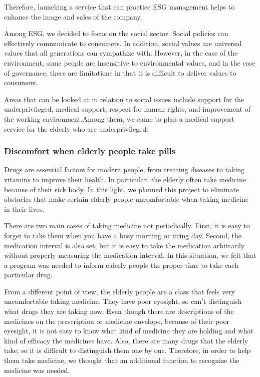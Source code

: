 \documentclass[conference]{IEEEtran}
\begin{document}
Therefore, launching a service that can practice ESG management helps to enhance the image and sales of the company.

Among ESG, we decided to focus on the social sector. Social policies can effectively communicate to consumers. In addition, social values are universal values that all generations can sympathize with. However, in the case of the environment, some people are insensitive to environmental values, and in the case of governance, there are limitations in that it is difficult to deliver values to consumers.

Areas that can be looked at in relation to social issues include support for the underprivileged, medical support, respect for human rights, and improvement of the working environment.Among them, we came to plan a medical support service for the elderly who are underprivileged.\\

\subsubsection{Discomfort when elderly people take pills}
Drugs are essential factors for modern people, from treating diseases to taking vitamins to improve their health. In particular, the elderly often take medicine because of their sick body. In this light, we planned this project to eliminate obstacles that make certain elderly people uncomfortable when taking medicine in their lives.

There are two main cases of taking medicine not periodically. First, it is easy to forget to take them when you have a busy morning or tiring day. Second, the medication interval is also set, but it is easy to take the medication arbitrarily without properly measuring the medication interval. In this situation, we felt that a program was needed to inform elderly people the proper time to take each particular drug.

From a different point of view, the elderly people are a class that feels very uncomfortable taking medicine. They have poor eyesight, so can’t distinguish what drugs they are taking now. Even though there are descriptions of the medicines on the prescription or medicine envelope, because of their poor eyesight, it is not easy to know what kind of medicine they are holding and what kind of efficacy the medicines have. Also, there are many drugs that the elderly take, so it is difficult to distinguish them one by one. Therefore, in order to help them take medicine, we thought that an additional function to recognize the medicine was needed.\\
\end{document}
